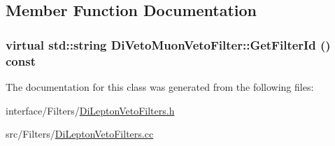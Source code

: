\subsection{Member Function Documentation}
\hypertarget{classDiVetoMuonVetoFilter_aae40c3df38f3e1e3661fdd8ccd343341}{
\subsubsection[{GetFilterId}]{\setlength{\rightskip}{0pt plus 5cm}virtual std::string DiVetoMuonVetoFilter::GetFilterId () const}}
\label{classDiVetoMuonVetoFilter_aae40c3df38f3e1e3661fdd8ccd343341}


The documentation for this class was generated from the following files:\begin{DoxyCompactItemize}
\item 
interface/Filters/\hyperlink{DiLeptonVetoFilters_8h}{DiLeptonVetoFilters.h}\item 
src/Filters/\hyperlink{DiLeptonVetoFilters_8cc}{DiLeptonVetoFilters.cc}\end{DoxyCompactItemize}
